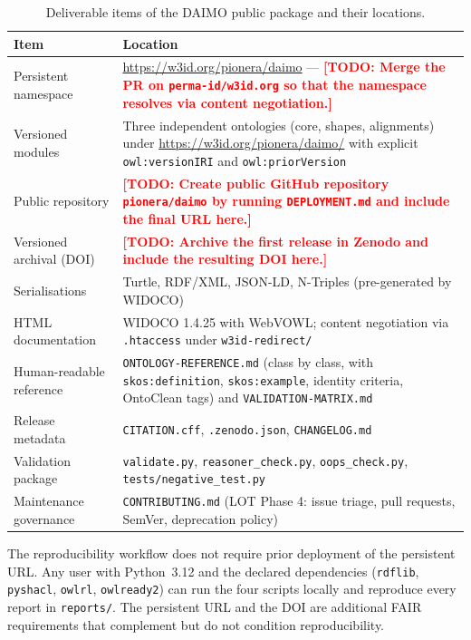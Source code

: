 \documentclass[Afour,sagev,times]{sagej}
\newcommand{\code}[1]{\texttt{#1}}
\newcommand{\TODO}[1]{\textcolor{red}{\textbf{[TODO: #1]}}}
\begin{document}
\begin{table}[h]
\small\sf\centering
\caption{Deliverable items of the DAIMO public package and their locations.\label{tab:avail}}
\begin{tabular}{@{}p{4cm}p{11cm}@{}}
\toprule
\textbf{Item} & \textbf{Location} \\
\midrule
Persistent namespace & \url{https://w3id.org/pionera/daimo} --- \TODO{Merge the PR on \texttt{perma-id/w3id.org} so that the namespace resolves via content negotiation.} \\
Versioned modules & Three independent ontologies (core, shapes, alignments) under \url{https://w3id.org/pionera/daimo/} with explicit \code{owl:versionIRI} and \code{owl:priorVersion} \\
Public repository & \TODO{Create public GitHub repository \texttt{pionera/daimo} by running \texttt{DEPLOYMENT.md} and include the final URL here.} \\
Versioned archival (DOI) & \TODO{Archive the first release in Zenodo and include the resulting DOI here.} \\
Serialisations & Turtle, RDF/XML, JSON-LD, N-Triples (pre-generated by WIDOCO) \\
HTML documentation & WIDOCO 1.4.25 with WebVOWL; content negotiation via \code{.htaccess} under \code{w3id-redirect/} \\
Human-readable reference & \code{ONTOLOGY-REFERENCE.md} (class by class, with \code{skos:definition}, \code{skos:example}, identity criteria, OntoClean tags) and \code{VALIDATION-MATRIX.md} \\
Release metadata & \code{CITATION.cff}, \code{.zenodo.json}, \code{CHANGELOG.md} \\
Validation package & \code{validate.py}, \code{reasoner\_check.py}, \code{oops\_check.py}, \code{tests/negative\_test.py} \\
Maintenance governance & \code{CONTRIBUTING.md} (LOT Phase 4: issue triage, pull requests, SemVer, deprecation policy) \\
\bottomrule
\end{tabular}
\end{table}

The reproducibility workflow does not require prior deployment of the persistent URL. Any user with Python~3.12 and the declared dependencies (\code{rdflib}, \code{pyshacl}, \code{owlrl}, \code{owlready2}) can run the four scripts locally and reproduce every report in \code{reports/}. The persistent URL and the DOI are additional FAIR requirements that complement but do not condition reproducibility.
\end{document}
